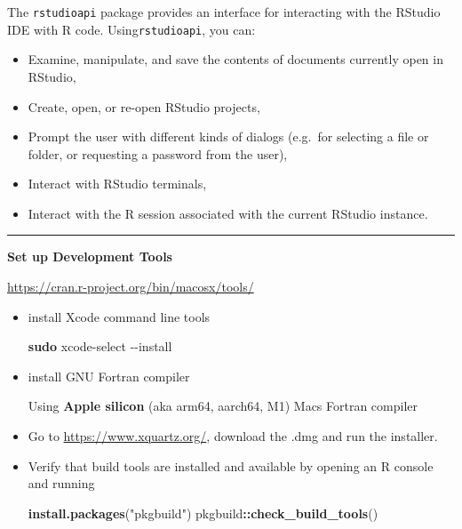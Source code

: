 \documentclass[
]{book}
\newenvironment{Shaded}{\begin{snugshade}}{\end{snugshade}}
\newcommand{\AttributeTok}[1]{\textcolor[rgb]{0.13,0.29,0.53}{#1}}
\newcommand{\FunctionTok}[1]{\textcolor[rgb]{0.13,0.29,0.53}{\textbf{#1}}}
\newcommand{\NormalTok}[1]{#1}
\newcommand{\SpecialCharTok}[1]{\textcolor[rgb]{0.81,0.36,0.00}{\textbf{#1}}}
\newcommand{\StringTok}[1]{\textcolor[rgb]{0.31,0.60,0.02}{#1}}
\providecommand{\tightlist}{%
  \setlength{\itemsep}{0pt}\setlength{\parskip}{0pt}}
\begin{document}
The {\texttt{rstudioapi}} package provides an interface for interacting with the RStudio IDE with R code. Using\texttt{rstudioapi}, you can:

\begin{itemize}
\tightlist
\item
  Examine, manipulate, and save the contents of documents currently open in RStudio,
\item
  Create, open, or re-open RStudio projects,
\item
  Prompt the user with different kinds of dialogs (e.g.~for selecting a file or folder, or requesting a password from the user),
\item
  Interact with RStudio terminals,
\item
  Interact with the R session associated with the current RStudio instance.
\end{itemize}

\begin{center}\rule{0.5\linewidth}{0.5pt}\end{center}

\textbf{Set up Development Tools}

\url{https://cran.r-project.org/bin/macosx/tools/}

\begin{itemize}
\item
  install Xcode command line tools

\begin{Shaded}
\begin{Highlighting}[]
\FunctionTok{sudo}\NormalTok{ xcode{-}select }\AttributeTok{{-}{-}install}
\end{Highlighting}
\end{Shaded}
\item
  install GNU Fortran compiler

  Using \textbf{Apple silicon} (aka arm64, aarch64, M1) Macs Fortran compiler
\item
  Go to \url{https://www.xquartz.org/}, download the .dmg and run the installer.
\item
  Verify that build tools are installed and available by opening an R console and running

\begin{Shaded}
\begin{Highlighting}[]
\FunctionTok{install.packages}\NormalTok{(}\StringTok{"pkgbuild"}\NormalTok{)}
\NormalTok{pkgbuild}\SpecialCharTok{::}\FunctionTok{check\_build\_tools}\NormalTok{()}
\end{Highlighting}
\end{Shaded}
\end{itemize}
\end{document}
